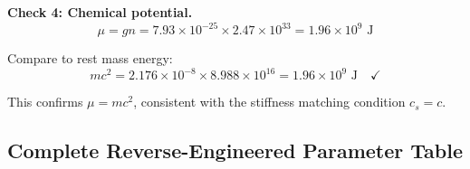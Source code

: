 \documentclass[11pt,a4paper]{article}
\newcommand{\ee}[1]{\times 10^{#1}}
\theoremstyle{definition}
\begin{document}
\textbf{Check 4: Chemical potential.}
\begin{equation}
\mu = gn = 7.93 \ee{-25} \times 2.47 \ee{33} = 1.96 \ee{9} \text{ J}
\end{equation}

Compare to rest mass energy:
\begin{equation}
mc^2 = 2.176 \ee{-8} \times 8.988 \ee{16} = 1.96 \ee{9} \text{ J} \quad \checkmark
\end{equation}

This confirms $\mu = mc^2$, consistent with the stiffness matching condition $c_s = c$.

\subsection{Complete Reverse-Engineered Parameter Table}
\label{sec:parameter_table}
\end{document}

